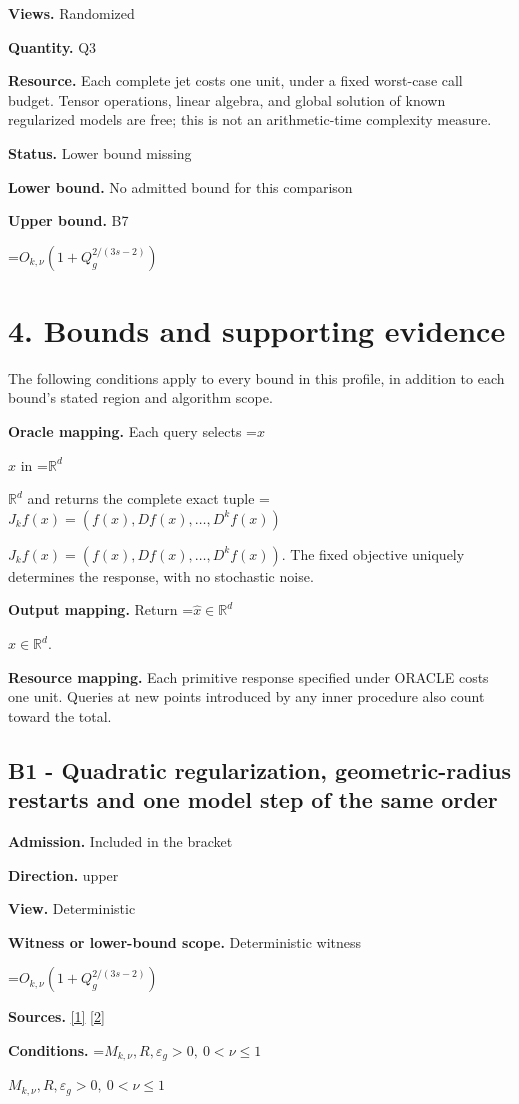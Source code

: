 \documentclass[10pt,a4paper]{article}
\newcommand{\AtlasMath}[1]{\par\begingroup\centering\setbox0=\hbox{$\displaystyle #1$}\ifdim\wd0>1.4\linewidth\typeout{ATLAS WIDE FORMULA: \the\wd0}\fi\ifdim\wd0>\linewidth\resizebox{\linewidth}{!}{\box0}\else\box0\fi\par\endgroup}
\newcommand{\AtlasInlineMath}[1]{\begingroup\setbox0=\hbox{$#1$}\ifdim\wd0>.4\linewidth\endgroup\AtlasMath{#1}\else\endgroup$#1$\fi}
\begin{document}
\textbf{Views.} Randomized

\textbf{Quantity.} Q3

\textbf{Resource.} Each complete jet costs one unit, under a fixed worst-case call budget. Tensor operations, linear algebra, and global solution of known regularized models are free; this is not an arithmetic-time complexity measure.

\textbf{Status.} Lower bound missing

\textbf{Lower bound.} No admitted bound for this comparison

\textbf{Upper bound.} B7

\AtlasMath{O_{k,\nu}(1+Q_g^{2/(3s-2)})}
\section{4. Bounds and supporting evidence}
The following conditions apply to every bound in this profile, in addition to each bound's stated region and algorithm scope.

\textbf{Oracle mapping.} Each query selects \AtlasInlineMath{x} in \AtlasInlineMath{\mathbb{R}^d} and returns the complete exact tuple \AtlasInlineMath{J_{k}f(x)=(f(x),Df(x),\ldots,D^{k}f(x))}. The fixed objective uniquely determines the response, with no stochastic noise.

\textbf{Output mapping.} Return \AtlasInlineMath{\widehat{x}\in \mathbb{R}^d}.

\textbf{Resource mapping.} Each primitive response specified under ORACLE costs one unit. Queries at new points introduced by any inner procedure also count toward the total.

\subsection{B1 - Quadratic regularization, geometric-radius restarts and one model step of the same order}
\textbf{Admission.} Included in the bracket

\textbf{Direction.} upper

\textbf{View.} Deterministic

\textbf{Witness or lower-bound scope.} Deterministic witness

\AtlasMath{O_{k,\nu}(1+Q_g^{2/(3s-2)})}
\textbf{Sources.} \href{https://arxiv.org/pdf/2411.08987v2}{[1]} \href{https://arxiv.org/pdf/2205.09647v1}{[2]}

\textbf{Conditions.} \AtlasInlineMath{M_{k,\nu},R,\varepsilon_g>0,\ 0<\nu\le1}
\end{document}
